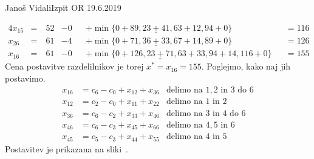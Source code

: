 \begin{naloga}{Janoš Vidali}{Izpit OR 19.6.2019}
\begin{odgovor}
\begin{enumerate}[(a)]
\begin{alignat*}{4}
x_{15} &=\ &{} 52 &-  0 &&+ \min\{0+89, \underline{23+41}, 63+12, 94+0\} &&= 116 \\
x_{26} &=\ &{} 61 &-  4 &&+ \min\{0+71, \underline{36+33}, 67+14, 89+0\} &&= 126 \\
x_{16} &=\ &{} 61 &-  0 &&+ \min\{0+126, \underline{23+71}, 63+33, 94+14, 116+0\} &&= 155
\end{alignat*}
Cena postavitve razdelilnikov je torej $x^* = x_{16} = 155$.
Poglejmo, kako naj jih postavimo.
\begin{align*}
x_{16} &= c_6 - c_0 + x_{12} + x_{36} & \text{delimo na $1, 2$ in $3$ do $6$} \\
x_{12} &= c_2 - c_0 + x_{11} + x_{22} & \text{delimo na $1$ in $2$} \\
x_{36} &= c_6 - c_2 + x_{33} + x_{46} & \text{delimo na $3$ in $4$ do $6$} \\
x_{46} &= c_6 - c_3 + x_{45} + x_{66} & \text{delimo na $4, 5$ in $6$} \\
x_{45} &= c_5 - c_3 + x_{44} + x_{55} & \text{delimo na $4$ in $5$}
\end{align*}
%
Postavitev je prikazana na sliki~\fig.
\begin{slika}
\pgfslika
{}
\end{slika}
\end{enumerate}
\end{odgovor}
\end{naloga}
